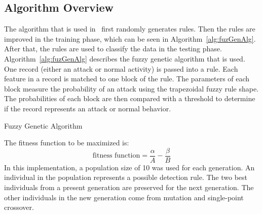 \documentclass{sig-alternate}
\begin{document}
\subsection{Algorithm Overview}
The algorithm that is used in~\cite{6496342, 6559603} first randomly generates rules. Then the rules are improved in the training phase, which can be seen in Algorithm~\ref{alg:fuzGenAlg}. After that, the rules are used to classify the data in the testing phase. Algorithm~\ref{alg:fuzGenAlg} describes the fuzzy genetic algorithm that is used. One record (either an attack or normal activity) is passed into a rule. Each feature in a record is matched to one block of the rule. The parameters of each block measure the probability of an attack using the trapezoidal fuzzy rule shape. The probabilities of each block are then compared with a threshold to determine if the record represents an attack or normal behavior.

\begin{algorithm}
\caption{Fuzzy Genetic Algorithm}
\label{alg:fuzGenAlg}
\begin{algorithmic}

    \ENDFOR
    
      \ELSE {}
    \ENDIF
  \ENDFOR
  
\ENDFOR
{}
\end{algorithmic}
\end{algorithm}


The fitness function to be maximized is:
\begin{equation*}
\textrm{fitness function} = \frac{\alpha}{A} - \frac{\beta}{B}
\end{equation*}
In this implementation, a population size of 10 was used for each generation. An individual in the population represents a possible detection rule. The two best individuals from a present generation are preserved for the next generation. The other individuals in the new generation come from mutation and single-point crossover.
\end{document}
